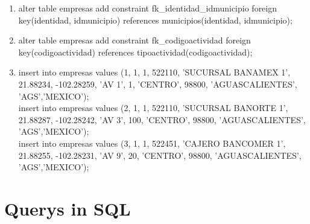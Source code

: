 \documentclass[10pt]{article}         %
\begin{document}
\begin{enumerate}
\item
alter table empresas add constraint fk\_identidad\_idmunicipio foreign key(identidad, idmunicipio) references municipios(identidad, idmunicipio);
\item
alter table empresas add constraint fk\_codigoactividad foreign key(codigoactividad) references tipoactividad(codigoactividad);

\item

insert into empresas values (1, 1, 1, 522110, 'SUCURSAL BANAMEX 1', 21.88234, -102.28259, 'AV 1', 1, 'CENTRO', 98800, 'AGUASCALIENTES', 'AGS','MEXICO');\\
insert into empresas values (2, 1, 1, 522110, 'SUCURSAL BANORTE 1', 21.88287, -102.28242, 'AV 3', 100, 'CENTRO', 98800, 'AGUASCALIENTES', 'AGS','MEXICO');\\
insert into empresas values (3, 1, 1, 522451, 'CAJERO BANCOMER 1', 21.88255, -102.28231, 'AV 9', 20, 'CENTRO', 98800, 'AGUASCALIENTES', 'AGS','MEXICO');

\end{enumerate}


\section{Querys in SQL}
\end{document}
